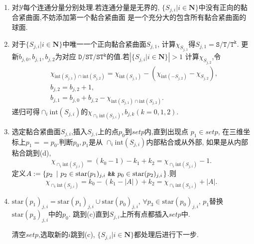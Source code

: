 \documentclass[a4paper]{book}
\numberwithin{equation}{chapter}
\theoremstyle{definition}
\begin{document}
\begin{enumerate}[a]
    \item 对$\mathcal{Y}$每个连通分量分别处理.若连通分量是无界的,
    $\{{S_{j,i}} | i \in \mathbf{N}\}$中没有正向的黏合紧曲面,不妨添加第一个黏合紧曲面
    是一个充分大的包含所有黏合紧曲面的球面.

    \item 对于$\{{S_{j,i}} | i \in \mathbf{N}\}$中唯一一个正向黏合紧曲面$S_{j,1}$,
    计算$\chi_{S_{j,1}}$得$S_{j,1} = \mathtt{S/T/T^k}$. 更新$b_{j,0}, b_{j,1}, b_{j,2}$为对应
    $\mathtt{D/ ST/ ST^k}$的值.若$\left|\{{S_{j,i}} | i \in \mathbf{N}\}\right| > 1$
    计算$\chi_{S_{j,2}}$,令
    \begin{align}
   &     \chi_{\text{int}(S_{j,1}) \cap \text{int}(S_{j,2})} = \chi_{\text{int}(S_{j,1})}
- (\chi_{\text{int}(-S_{j,2})} - \chi_{S_{j,2}}), \\
 &b_{j,2} = b_{j,2} + 1, \\
  &b_{j,1} =b_{j,0} + b_{j,2}
     - \chi_{\text{int}(S_{j,1}) \cap \text{int}(S_{j,2})}.
    \end{align}
    递归可得$\cap_i \text{int}(S_{j,i})$的$\chi_{\cap_i \text{int}(S_{j,i})} , b_{j, k}(k = 0,1,2)$.

    \item 选定黏合紧曲面$S_{j,i}$,插入$S_{j,i}$上的点$p_0$到$setp$内,直到出现点
    $p_1 \in setp$, 在三维坐标上$p_1 == p_0$.判断$p_0,p_1$是从
    $\cap_i \text{int}(S_{j,i})$内部粘合或从外部,
    如果是从内部粘合跳到(d),
    \begin{equation}
        \chi_{\cap_i \text{int}(S_{j,i})} = (k_0 - 1) - k_1 + k_2 =  
       \chi_{\cap_i \text{int}(S_{j,i})}  -1.
    \end{equation}
    定义$A := \{p_2\ \left|\  p_2 \in \text{star}(p_1)_{j,i}\ \verb'&&'
    \ p_0 \in \text{star}(p_2)_{j,i}\right. \}$.则
    \begin{equation}
       \chi_{\cap_i \text{int}(S_{j,i})} = k_0 - (k_1 - \left| A \right| )+ k_2 
        =\chi_{\cap_i \text{int}(S_{j,i})} +\left| A \right|.
    \end{equation}

    \item 
    $\text{star}(p_1)_{j,i} = \text{star}(p_1)_{j,i} \cup \text{star}(p_0)_{j,i}$,
    $\forall p_3 \in \text{star}(p_0)_{j,i}$, $p_1$替换$\text{star}(p_3)_{j,i}$中的$p_0$.
    跳到(c)直到$S_{j,i}$上所有点都插入$setp$中.
    
    清空$setp$,选取新的$i$跳到(c), $\{{S_{j,i}} | i \in \mathbf{N}\}$都处理后进行下一步.


\end{enumerate}
\end{document}
